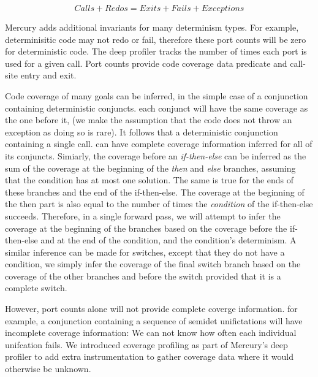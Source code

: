 \begin{equation*}
Calls + Redos = Exits + Fails + Exceptions
\end{equation*}

\noindent
Mercury adds additional invariants for many determinism types.
For example, determinisitic code may not redo or fail,
therefore these port counts will be zero for deterministic code.
The deep profiler tracks the number of times each port is used for a given
call.
Port counts provide code coverage data predicate and call-site entry and exit.

Code coverage of many goals can be inferred,
in the simple case of a conjunction containing deterministic conjuncts.
each conjunct will have the same coverage as the one before it,
(we make the assumption that the code does not throw an exception
as doing so is rare).
It follows that a deterministic conjunction containing a single call.
can have complete coverage information inferred for all of its conjuncts.
Simiarly,
the coverage before an \emph{if-then-else} can be inferred as the sum
of the coverage at the beginning of the \emph{then} and \emph{else}
branches,
assuming that the condition has at most one solution.
The same is true for the ends of these branches and the end of the
if-then-else.
The coverage at the beginning of the then part is also equal to the
number of times the \emph{condition} of the if-then-else succeeds.
Therefore,
in a single forward pass,
we will attempt to infer the coverage at the beginning of the branches
based on the coverage before the if-then-else and at the end of the
condition,
and the condition's determinism.
A similar inference can be made for switches,
except that they do not have a condition,
we simply infer the
coverage of the final switch branch based on the coverage of the other
branches and before the switch provided that it is a complete switch.

However, port counts alone will not provide complete coverge information.
for example, a conjunction containing a sequence of semidet
unifictations will have incomplete coverage information:
We can not know how often each individual unifcation fails.
We introduced coverage profiling as part of Mercury's deep profiler to
add extra instrumentation to gather coverage data where it would
otherwise be unknown.

